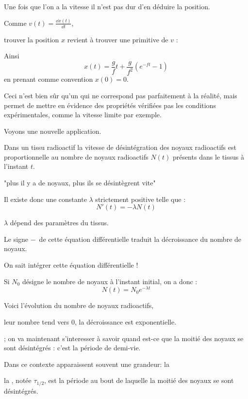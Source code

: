   \change
  
Une fois que l'on a la vitesse il n'est pas dur d'en déduire la position.

\change
  Comme  $v(t) = \frac{\dd x(t)}{\dd t}$, 
  
  \change
  trouver la position $x$ revient à trouver 
  une primitive de $v$ :
  
  \change
  Ainsi 
  $$x(t) = \frac{g}{f} t + \frac{g}{f^2}(e^{-ft}-1)$$
  en prenant comme convention $x(0)=0$.


Ceci n'est bien sûr qu'un  qui ne correspond 
pas parfaitement à la réalité, mais permet de mettre en évidence
des propriétés vérifiées pas les conditions expérimentales, 
comme la vitesse limite par exemple.


\diapo

Voyons une nouvelle application.

\change
Dans un tissu radioactif la vitesse de désintégration 
des noyaux radioactifs est proportionnelle 
au nombre de noyaux radioactifs $N(t)$ présents dans le
tissus à l'instant $t$. 

"plus il y a de noyaux, plus ils se désintègrent vite"

\change
Il existe donc une constante $\lambda$ strictement positive telle que :
$$N'(t) = -\lambda N(t)$$


$\lambda$ dépend des paramètres du tissus.

Le signe \og$-$\fg\ de cette équation différentielle traduit la
décroissance du nombre de noyaux.

\change
On sait intégrer cette équation différentielle !

Si $N_0$ désigne le nombre de noyaux à l'instant initial, on a donc :
$$N(t) = N_0 e^{-\lambda t}$$

\change
Voici l'évolution du nombre de noyaux radioactifs,

leur nombre tend vers $0$, la décroissance est exponentielle.

; on va maintenant s'interesser
à savoir quand est-ce que la moitié des noyaux se sont désintégrés : c'est la période de demi-vie.


\diapo


Dans ce contexte apparaissent souvent une grandeur: la 

\change
la , notée $\tau_{1/2}$, 
  est la période au bout de laquelle la moitié des noyaux se
  sont désintégrés. 
  
